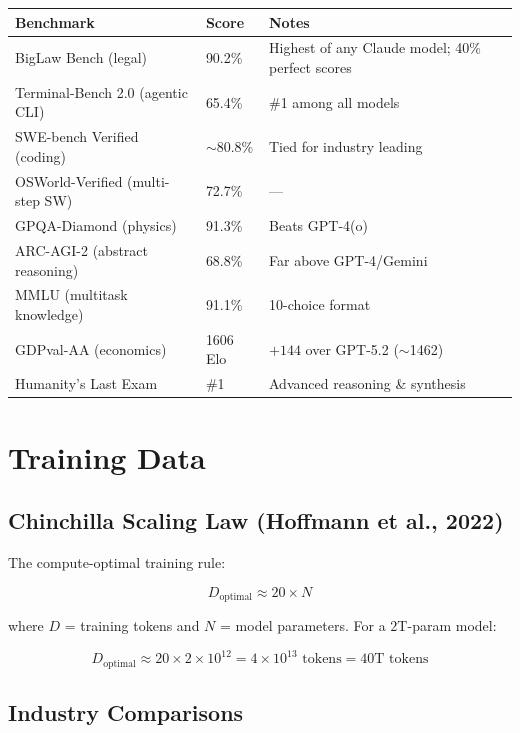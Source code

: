 \documentclass[11pt,a4paper]{article}
\begin{document}
\begin{center}
\begin{tabular}{lll}
\toprule
\textbf{Benchmark} & \textbf{Score} & \textbf{Notes} \\
\midrule
BigLaw Bench (legal) & 90.2\% & Highest of any Claude model; 40\% perfect scores \\
Terminal-Bench 2.0 (agentic CLI) & 65.4\% & \#1 among all models \\
SWE-bench Verified (coding) & $\sim$80.8\% & Tied for industry leading \\
OSWorld-Verified (multi-step SW) & 72.7\% & --- \\
GPQA-Diamond (physics) & 91.3\% & Beats GPT-4(o) \\
ARC-AGI-2 (abstract reasoning) & 68.8\% & Far above GPT-4/Gemini \\
MMLU (multitask knowledge) & 91.1\% & 10-choice format \\
GDPval-AA (economics) & 1606 Elo & $+144$ over GPT-5.2 ($\sim$1462) \\
Humanity's Last Exam & \#1 & Advanced reasoning \& synthesis \\
\bottomrule
\end{tabular}
\end{center}

\section{Training Data}

\subsection{Chinchilla Scaling Law (Hoffmann et al., 2022)}

The compute-optimal training rule:

$$D_{\text{optimal}} \approx 20 \times N$$

where $D$ = training tokens and $N$ = model parameters. For a $2$T-param model:

$$D_{\text{optimal}} \approx 20 \times 2 \times 10^{12} = 4 \times 10^{13} \text{ tokens} = 40\text{T tokens}$$

\subsection{Industry Comparisons}
\end{document}
